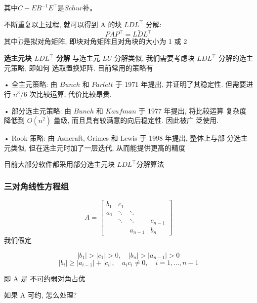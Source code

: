 \documentclass[12pt,a4paper]{article}
\begin{document}
其中$C-E B^{-1} E^{\top}$是$Schur$补。

不断重复以上过程, 就可以得到 A 的块 $LDL^{\top}$ 分解:
\begin{equation}
P A P^{\top}=L \tilde{D} L^{\top}
\end{equation}
其中$\tilde{D}$是拟对角矩阵, 即块对角矩阵且对角块的大小为 1 或 2

{\bfseries 选主元块 $LDL^{\top}$ 分解}
与选主元 $LU$ 分解类似, 我们需要考虑块 $LDL^{\top}$ 分解的选主元策略, 即如何
选取置换矩阵. 目前常用的策略有

• 全主元策略: 由 $Bunch$ 和 $Parlett$ 于 1971 年提出, 并证明了其稳定性.
但需要进行 $n^3/6$ 次比较运算, 代价比较昂贵.

• 部分选主元策略: 由 $Bunch$ 和 $Kaufman$ 于 1977 年提出, 将比较运算
复杂度降低到 $O(n^2)$ 量级, 而且具有较满意的向后稳定性. 因此被广
泛使用.

• Rook 策略: 由 Ashcraft, Grimes 和 Lewis 于 1998 年提出, 整体上与部
分选主元类似, 但在选主元时加了一层迭代, 从而能提供更高的精度

\begin{framed}
	目前大部分软件都采用部分选主元块 $LDL^{\top}$分解算法
\end{framed}

\subsubsection{三对角线性方程组}
\begin{equation}
A=\left[\begin{array}{cccc}{b_{1}} & {c_{1}} & {} & {} \\ {a_{1}} & {\ddots} & {\ddots} & {} \\ {} & {\ddots} & {\ddots} & {c_{n-1}} \\ {} & {} & {a_{n-1}} & {b_{n}}\end{array}\right]
\end{equation}
我们假定

\begin{equation}
\left|b_{1}\right|>\left|c_{1}\right|>0, \quad\left|b_{n}\right|>\left|a_{n-1}\right|>0
\end{equation}
\begin{equation}
\left|b_{i}\right| \geq\left|a_{i-1}\right|+\left|c_{i}\right|, \quad a_{i} c_{i} \neq 0, \quad i=1, \ldots, n-1
\end{equation}

即 A 是 不可约弱对角占优

\begin{framed}
	如果 A 可约, 怎么处理?
\end{framed}
\end{document}
